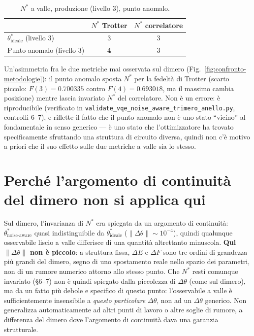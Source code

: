 \documentclass[11pt,a4paper]{article}
\begin{document}
\begin{table}[htbp]
\centering
\caption{$N^*$ a valle, produzione (livello 3), punto anomalo.}
\begin{tabular}{lcc}
\toprule
& $N^*$ Trotter & $N^*$ correlatore \\
\midrule
$\theta^*_\text{ideale}$ (livello 3) & 3 & 3 \\
Punto anomalo (livello 3) & \textbf{4} & 3 \\
\bottomrule
\end{tabular}
\end{table}

Un'asimmetria fra le due metriche mai osservata sul dimero (Fig.~\ref{fig:confronto-metodologie}):
il punto anomalo sposta $N^*$ per la fedeltà di Trotter (scarto piccolo: $F(3)=0.700335$ contro
$F(4)=0.693018$, ma il massimo cambia posizione) mentre lascia invariato $N^*$ del correlatore.
Non è un errore: è riproducibile (verificato in
\texttt{validate\_vqe\_noise\_aware\_trimero\_anello.py}, controlli 6--7), e riflette il fatto che
il punto anomalo non è uno stato ``vicino'' al fondamentale in senso generico --- è uno stato che
l'ottimizzatore ha trovato specificamente sfruttando una struttura di circuito diversa, quindi non
c'è motivo a priori che il suo effetto sulle due metriche a valle sia lo stesso.


\section{Perché l'argomento di continuità del dimero non si applica qui}

Sul dimero, l'invarianza di $N^*$ era spiegata da un argomento di continuità:
$\theta^*_\text{noise-aware}$ quasi indistinguibile da $\theta^*_\text{ideale}$
($\|\Delta\theta\|\sim10^{-4}$), quindi qualunque osservabile liscio a valle differisce di una
quantità altrettanto minuscola. \textbf{Qui $\|\Delta\theta\|$ non è piccolo}: a struttura fissa,
$\Delta E$ e $\Delta F$ sono tre ordini di grandezza più grandi del dimero, segno di uno
spostamento reale nello spazio dei parametri, non di un rumore numerico attorno allo stesso punto.
Che $N^*$ resti comunque invariato (§6--7) non è quindi spiegato dalla piccolezza di
$\Delta\theta$ (come sul dimero), ma da un fatto più debole e specifico di questo punto:
l'osservabile a valle è sufficientemente insensibile a \emph{questo particolare} $\Delta\theta$,
non ad un $\Delta\theta$ generico. Non generalizza automaticamente ad altri punti di lavoro o
altre soglie di rumore, a differenza del dimero dove l'argomento di continuità dava una garanzia
strutturale.
\end{document}

